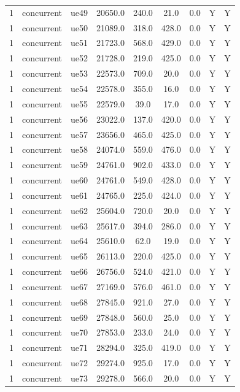 \begin{table}[ht]
\begin{tabular}{|c|c|c|c|c|c|c|c|c|}
1 & concurrent & ue49 & 20650.0 & 240.0 & 21.0 & 0.0 & Y & Y \\
1 & concurrent & ue50 & 21089.0 & 318.0 & 428.0 & 0.0 & Y & Y \\
1 & concurrent & ue51 & 21723.0 & 568.0 & 429.0 & 0.0 & Y & Y \\
1 & concurrent & ue52 & 21728.0 & 219.0 & 425.0 & 0.0 & Y & Y \\
1 & concurrent & ue53 & 22573.0 & 709.0 & 20.0 & 0.0 & Y & Y \\
1 & concurrent & ue54 & 22578.0 & 355.0 & 16.0 & 0.0 & Y & Y \\
1 & concurrent & ue55 & 22579.0 & 39.0 & 17.0 & 0.0 & Y & Y \\
1 & concurrent & ue56 & 23022.0 & 137.0 & 420.0 & 0.0 & Y & Y \\
1 & concurrent & ue57 & 23656.0 & 465.0 & 425.0 & 0.0 & Y & Y \\
1 & concurrent & ue58 & 24074.0 & 559.0 & 476.0 & 0.0 & Y & Y \\
1 & concurrent & ue59 & 24761.0 & 902.0 & 433.0 & 0.0 & Y & Y \\
1 & concurrent & ue60 & 24761.0 & 549.0 & 428.0 & 0.0 & Y & Y \\
1 & concurrent & ue61 & 24765.0 & 225.0 & 424.0 & 0.0 & Y & Y \\
1 & concurrent & ue62 & 25604.0 & 720.0 & 20.0 & 0.0 & Y & Y \\
1 & concurrent & ue63 & 25617.0 & 394.0 & 286.0 & 0.0 & Y & Y \\
1 & concurrent & ue64 & 25610.0 & 62.0 & 19.0 & 0.0 & Y & Y \\
1 & concurrent & ue65 & 26113.0 & 220.0 & 425.0 & 0.0 & Y & Y \\
1 & concurrent & ue66 & 26756.0 & 524.0 & 421.0 & 0.0 & Y & Y \\
1 & concurrent & ue67 & 27169.0 & 576.0 & 461.0 & 0.0 & Y & Y \\
1 & concurrent & ue68 & 27845.0 & 921.0 & 27.0 & 0.0 & Y & Y \\
1 & concurrent & ue69 & 27848.0 & 560.0 & 25.0 & 0.0 & Y & Y \\
1 & concurrent & ue70 & 27853.0 & 233.0 & 24.0 & 0.0 & Y & Y \\
1 & concurrent & ue71 & 28294.0 & 325.0 & 419.0 & 0.0 & Y & Y \\
1 & concurrent & ue72 & 29274.0 & 925.0 & 17.0 & 0.0 & Y & Y \\
1 & concurrent & ue73 & 29278.0 & 566.0 & 20.0 & 0.0 & Y & Y \\

\end{tabular}
\end{table}
